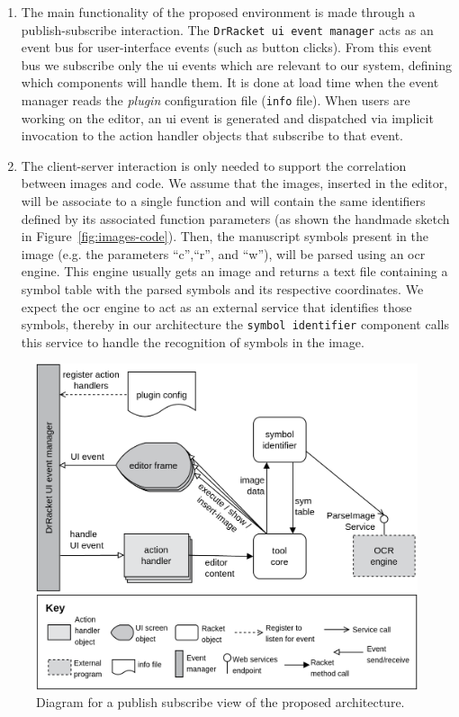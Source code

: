 \begin{enumerate}
	\item The main functionality of the proposed environment is made through a publish-subscribe interaction. The \texttt{DrRacket \gls{ui} event manager} acts as an event bus for user-interface events (such as button clicks). From this event bus we subscribe only the \gls{ui} events which are relevant to our system, defining which components will handle them. It is done at load time when the event manager reads the \textit{plugin} configuration file (\texttt{info} file). When users are working on the editor, an \gls{ui} event is generated and dispatched via implicit invocation to the action handler objects that subscribe to that event.

	\item The client-server interaction is only needed to support the correlation between images and code. We assume that the images, inserted in the editor, will be associate to a single function and will contain the same identifiers defined by its associated function parameters (as shown the handmade sketch in Figure~\ref{fig:images-code}). Then, the manuscript symbols present in the image (e.g. the parameters ``c'',``r'', and ``w''), will be parsed using an \gls{ocr} engine. This engine usually gets an image and returns a text file containing a symbol table with the parsed symbols and its respective coordinates. We expect the \gls{ocr} engine to act as an external service that identifies those symbols, thereby in our architecture the \texttt{symbol identifier} component calls this service to handle the recognition of symbols in the image.
\end{enumerate}

\begin{figure}[htb]
	\centering
	\includegraphics[scale=0.19]{images/solution}
	\caption{Diagram for a publish subscribe view of the proposed architecture.}
	\label{fig:solution}
\end{figure}

